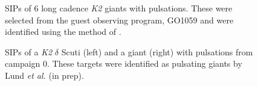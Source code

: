 \documentclass[useAMS, usenatbib, preprint, 12pt]{aastex}
\begin{document}
\begin{figure}
\begin{center}
{        }
    \end{center}
    \caption{SIPs of 6 long cadence {\it K2} giants with pulsations. These
	     were selected from the guest observing program, GO1059 and were
	     identified using the method of \citet{Huber2009}.
\label{fig:astero_examples}}
\end{figure}

\begin{figure}
\begin{center}
    \end{center}
    \caption{SIPs of a {\it K2} $\delta$ Scuti (left) and a giant (right) with
	    pulsations from campaign 0. These targets were identified as
	    pulsating giants by Lund {\it et al.} (in prep).
\label{fig:c0}}
\end{figure}
\end{document}
